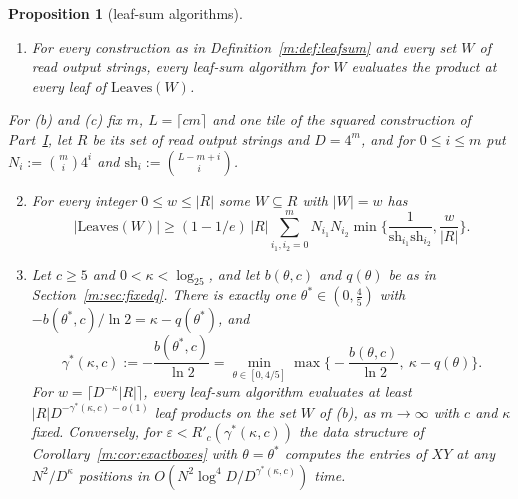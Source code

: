 \documentclass[11pt]{article}
\newtheorem{proposition}[theorem]{Proposition}
\theoremstyle{definition}
\theoremstyle{remark}
\newcommand{\Leaves}{\mathrm{Leaves}}
\begin{document}
\begin{proposition}[leaf-sum algorithms]\label{m:prop:leafsum}
\begin{enumerate}[label=(\alph*),nosep]
\item For every construction as in Definition~\ref{m:def:leafsum} and every set $W$ of read output strings, every leaf-sum algorithm for $W$ evaluates the product at every leaf of $\Leaves(W)$.
\end{enumerate}
For (b) and (c) fix $m$, $L=\lceil cm\rceil$ and one tile of the squared construction of Part~\hyperref[m:partI]{I}, let $R$ be its set of read output strings and $D=4^m$, and for $0\le i\le m$ put $N_i:=\binom mi4^i$ and $\mathrm{sh}_i:=\binom{L-m+i}i$.
\begin{enumerate}[label=(\alph*),nosep]\setcounter{enumi}{1}
\item For every integer $0\le w\le|R|$ some $W\subseteq R$ with $|W|=w$ has
\[
|\Leaves(W)|\ge(1-1/e)\,|R|\sum_{i_1,i_2=0}^mN_{i_1}N_{i_2}\min\Big\{\frac1{\mathrm{sh}_{i_1}\mathrm{sh}_{i_2}},\frac w{|R|}\Big\}.
\]
\item Let $c\ge5$ and $0<\kappa<\log_25$, and let $b(\theta,c)$ and $q(\theta)$ be as in Section~\ref{m:sec:fixedq}. There is exactly one $\theta^*\in(0,\frac45)$ with $-b(\theta^*,c)/\ln2=\kappa-q(\theta^*)$, and
\[
\gamma^*(\kappa,c):=-\frac{b(\theta^*,c)}{\ln2}=\min_{\theta\in[0,4/5]}\max\Big\{-\frac{b(\theta,c)}{\ln2},\ \kappa-q(\theta)\Big\}.
\]
For $w=\lceil D^{-\kappa}|R|\rceil$, every leaf-sum algorithm evaluates at least $|R|D^{-\gamma^*(\kappa,c)-o(1)}$ leaf products on the set $W$ of (b), as $m\to\infty$ with $c$ and $\kappa$ fixed. Conversely, for $\varepsilon<R'_c(\gamma^*(\kappa,c))$ the data structure of Corollary~\ref{m:cor:exactboxes} with $\theta=\theta^*$ computes the entries of $XY$ at any $N^2/D^\kappa$ positions in $O(N^2\log^4\!D/D^{\gamma^*(\kappa,c)})$ time.
\end{enumerate}
\end{proposition}
\end{document}

